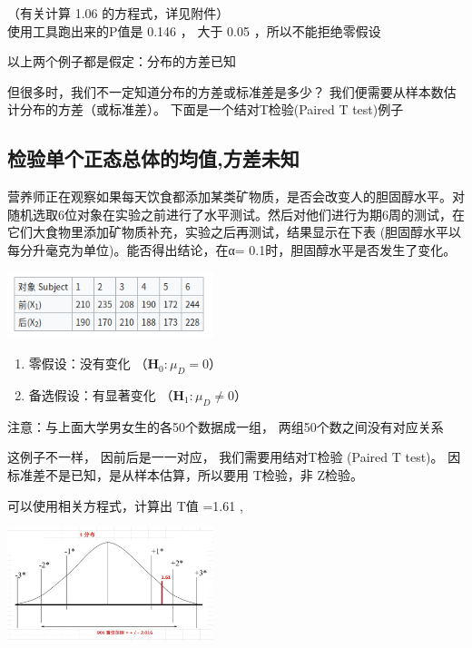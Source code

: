 （有关计算 1.06 的方程式，详见附件）\\
使用工具跑出来的P值是 0.146 ， 大于 0.05 ，所以不能拒绝零假设

以上两个例子都是假定：分布的方差已知

但很多时，我们不一定知道分布的方差或标准差是多少？
我们便需要从样本数估计分布的方差（或标准差）。
下面是一个结对T检验(Paired T test)例子

\hypertarget{ux68c0ux9a8cux5355ux4e2aux6b63ux6001ux603bux4f53ux7684ux5747ux503cux65b9ux5deeux672aux77e5}{%
\subsection{检验单个正态总体的均值,方差未知}\label{ux68c0ux9a8cux5355ux4e2aux6b63ux6001ux603bux4f53ux7684ux5747ux503cux65b9ux5deeux672aux77e5}}

营养师正在观察如果每天饮食都添加某类矿物质，是否会改变人的胆固醇水平。对随机选取6位对象在实验之前进行了水平测试。然后对他们进行为期6周的测试，在它们大食物里添加矿物质补充，实验之后再测试，结果显示在下表
(胆固醇水平以每分升毫克为单位)。能否得出结论，在α=
0.1时，胆固醇水平是否发生了变化。


\includegraphics[width=6cm]{Screenshotfrom2022-12-2822-37-19.png}

\begin{enumerate}
\tightlist
\item
  零假设：没有变化 （\(\mathbf{H}_0: \mu _D = 0\)）
\item
  备选假设：有显著变化 （\(\mathbf{H}_1: \mu _D \neq 0\)）
\end{enumerate}

注意：与上面大学男女生的各50个数据成一组， 两组50个数之间没有对应关系

这例子不一样， 因前后是一一对应， 我们需要用结对T检验 (Paired T test)。
因标准差不是已知，是从样本估算，所以要用 T检验，非 Z检验。

可以使用相关方程式，计算出 T值 =1.61 ,


\includegraphics[width=6cm]{CholesterolEg2022-07-23_195121.jpg}

